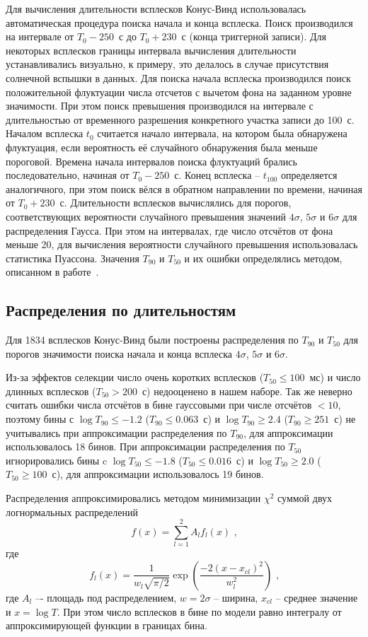 Для вычисления длительности всплесков Конус-Винд использовалась автоматическая процедура поиска начала и конца всплеска. Поиск производился на интервале от $T_0-250$~с до $T_0+230$~с (конца триггерной записи). Для некоторых всплесков границы интервала вычисления длительности устанавливались визуально, к примеру, это делалось в случае присутствия солнечной вспышки в данных. Для поиска начала всплеска производился поиск положительной флуктуации числа отсчетов с вычетом фона на заданном уровне значимости. При этом поиск превышения производился на интервале с длительностью от временного разрешения конкретного участка записи до 100~с. Началом всплеска $t_0$ считается начало интервала, на котором была обнаружена флуктуация, если вероятность её случайного обнаружения была меньше пороговой. Времена начала интервалов поиска флуктуаций брались последовательно, начиная от $T_0-250$~с. Конец всплеска -- $t_{100}$ определяется аналогичного, при этом поиск вёлся в обратном направлении по времени, начиная от $T_0 + 230$~с. Длительности всплесков вычислялись для порогов, соответствующих вероятности случайного превышения значений $4\sigma$, $5\sigma$ и $6\sigma$ для распределения Гаусса. При этом на интервалах, где число отсчётов от фона меньше 20, для вычисления вероятности случайного превышения использовалась статистика Пуассона. Значения $T_{90}$ и $T_{50}$ и их ошибки определялись методом, описанном в работе~\citep{Koshut_1996}. 

\subsection{Распределения по длительностям}
Для 1834 всплесков Конус-Винд были построены распределения по $T_{90}$ и $T_{50}$ для порогов значимости поиска начала и конца всплеска $4\sigma$, $5\sigma$ и $6\sigma$. 

Из-за эффектов селекции число очень коротких всплесков ($T_{50} \leq 100$~мс) и число длинных всплесков ($T_{50} > 200$~с) недооценено в нашем наборе. Так же неверно считать ошибки числа отсчётов в бине гауссовыми при числе отсчётов $<10$, поэтому бины с $\log T_{90} \leq-1.2$ ($T_{90} \leq 0.063$~с) и $\log T_{90} \geq 2.4$ ($T_{90} \geq 251$~с) не учитывались при аппроксимации распределения по $T_{90}$,  для аппроксимации использовалось 18 бинов. При аппроксимации распределения по $T_{50}$ игнорировались бины c $\log T_{50} \leq -1.8$ ($T_{50} \leq 0.016$~с) и  $\log T_{50} \geq 2.0$ ($T_{50} \geq 100$~с), для аппроксимации использовалось 19 бинов.

Распределения  аппроксимировались методом минимизации $\chi^2$ суммой двух логнормальных распределений
\begin{equation}
f(x) = \sum_{l=1}^{2} A_l f_l(x) \mbox{ ,}
\end{equation}
где
\begin{equation}
f_l(x) = \frac{1}{w_l \sqrt{\pi/2}} \exp\left(\frac{-2(x-x_{cl})^2}{w_l^2}\right) \mbox{ ,}
\end{equation}
где $A_l$ –- площадь под распределением, $w=2\sigma$ -- ширина, $x_{cl}$ -- среднее значение и $x=\log T$. При этом число всплесков в бине по модели равно  интегралу от аппроксимирующей функции в границах бина. 

